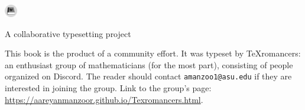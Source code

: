 \documentclass[../main]{subfiles}
\begin{document}

\newpage
\thispagestyle{empty}

\begin{center}
    \Huge{
    \includegraphics[height=1.5em]{texromancers_gray.pdf}
    }
    
    \normalsize{A collaborative typesetting project}
\end{center}

\noindent\makebox[\linewidth]{\rule{\linewidth}{0.4pt}}

\bigskip

This book is the product of a community effort. It was typeset by \TeX{}romancers: an enthusiast group of mathematicians (for the most part), consisting of people organized on Discord. The reader should contact \texttt{amanzoo1@asu.edu} if they are interested in joining the group. Link to the group's page: \url{https://aareyanmanzoor.github.io/Texromancers.html}.

\noindent\makebox[\linewidth]{\rule{\linewidth}{0.4pt}}

\bigskip
\end{document}
